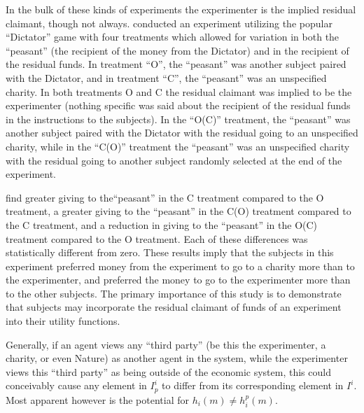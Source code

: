 \documentclass[../main.tex]{subfiles}
\begin{document}
In the bulk of these kinds of experiments the experimenter is the implied residual claimant, though not always.
\textcite{Harrison2006} conducted an experiment utilizing the popular \enquote{Dictator} game with four treatments which allowed for variation in both the \enquote{peasant} (the recipient of the money from the Dictator) and in the recipient of the residual funds.
In treatment \enquote{O}, the \enquote{peasant} was another subject paired with the Dictator, and in treatment \enquote{C}, the \enquote{peasant} was an unspecified charity.
In both treatments O and C the residual claimant was implied to be the experimenter (nothing specific was said about the recipient of the residual funds in the instructions to the subjects).
In the \enquote{O(C)} treatment, the \enquote{peasant} was another subject paired with the Dictator with the residual going to an unspecified charity, while in the \enquote{C(O)} treatment the \enquote{peasant} was an unspecified charity with the residual going to another subject randomly selected at the end of the experiment.

\textcite[196]{Harrison2006} find greater giving to the\enquote{peasant} in the C treatment compared to the O treatment, a greater giving to the \enquote{peasant} in the C(O) treatment compared to the C treatment, and a reduction in giving to the \enquote{peasant} in the O(C) treatment compared to the O treatment.
Each of these differences was statistically different from zero.
These results imply that the subjects in this experiment preferred money from the experiment to go to a charity more than to the experimenter, and preferred the money to go to the experimenter more than to the other subjects.
The primary importance of this study is to demonstrate that subjects may incorporate the residual claimant of funds of an experiment into their utility functions. 

Generally, if an agent views any \enquote{third party} (be this the experimenter, a charity, or even Nature) as another agent in the system, while the experimenter views this \enquote{third party} as being outside of the economic system, this could conceivably cause any element in $I^i_p$ to differ from its corresponding element in $I^i$.
Most apparent however is the potential for $h_i(m) \neq h_i^p(m)$.
\end{document}
